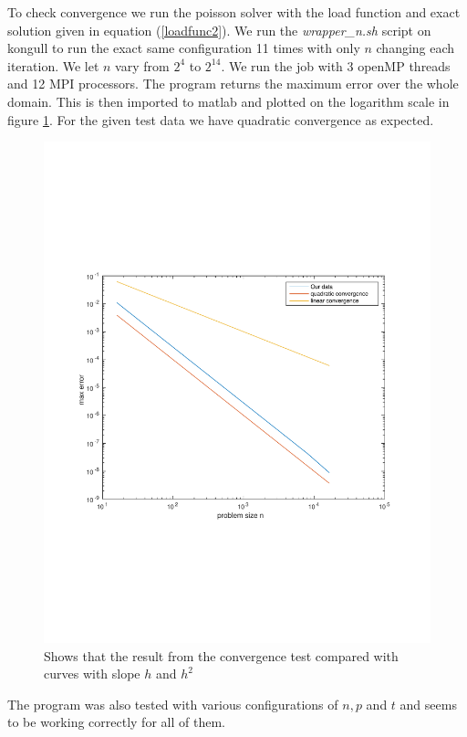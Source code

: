 To check convergence we run the poisson solver with the load function and exact solution given in equation (\ref{loadfunc2}). We run the \textit{wrapper\_n.sh} script on kongull to run the exact same configuration 11 times with only $n$ changing each iteration. We let $n$ vary from $2^4$ to $2^{14}$. We run the job with 3 openMP threads and 12 MPI processors. The program returns the maximum error over the whole domain. This is then imported to matlab and plotted on the logarithm scale in figure \ref{fig:checkConv}. For the given test data we have quadratic convergence as expected.


\begin{figure}[h]
\centering
\includegraphics[width=0.6\linewidth]{./figures/checkConv}
\caption{Shows that the result from the convergence test compared with curves with slope $h$ and $h^2$}
\label{fig:checkConv}
\end{figure}

The program was also tested with various configurations of $n, p$ and $t$ and seems to be working correctly for all of them.